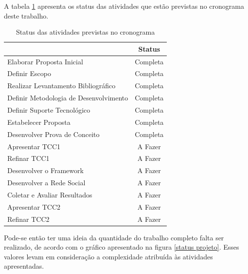 A tabela \ref{status atividades} apresenta os status das atividades que estão previstas no cronograma deste trabalho.

\newpage

\begin{table}[h]
\centering
\caption{Status das atividades previstas no cronograma}
\label{status atividades}
\begin{tabular}{|l|c|}
\hline
                                       & Status   \\ \hline
Elaborar Proposta Inicial              & Completa \\ \hline
Definir Escopo                         & Completa \\ \hline
Realizar Levantamento Bibliográfico    & Completa \\ \hline
Definir Metodologia de Desenvolvimento & Completa \\ \hline
Definir Suporte Tecnológico            & Completa \\ \hline
Estabelecer Proposta                   & Completa \\ \hline
Desenvolver Prova de Conceito          & Completa \\ \hline
Apresentar TCC1                        & A Fazer  \\ \hline
Refinar TCC1                           & A Fazer  \\ \hline
Desenvolver o Framework                & A Fazer  \\ \hline
Desenvolver a Rede Social              & A Fazer  \\ \hline
Coletar e Avaliar Resultados           & A Fazer  \\ \hline
Apresentar TCC2                        & A Fazer  \\ \hline
Refinar TCC2                           & A Fazer  \\ \hline
\end{tabular}
\end{table}

Pode-se então ter uma ideia da quantidade do trabalho completo falta ser realizado, de acordo com o gráfico apresentado na figura \ref{status projeto}. Esses valores levam em consideração a complexidade atribuída às atividades apresentadas.

